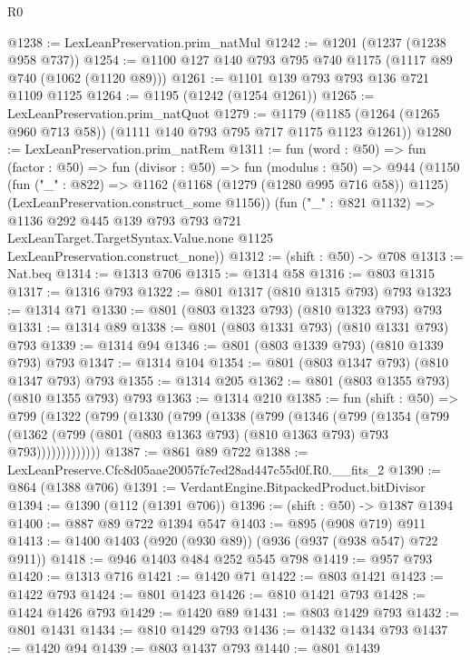 \begin{lexlean}{R0}
\begin{coremodule}
@1238 := LexLeanPreservation.prim_natMul
@1242 := @1201 (@1237 (@1238 @958 @737))
@1254 := @1100 @127 @140 @793 @795 @740 @1175 (@1117 @89 @740 (@1062 (@1120 @89)))
@1261 := @1101 @139 @793 @793 @136 @721 @1109 @1125
@1264 := @1195 (@1242 (@1254 @1261))
@1265 := LexLeanPreservation.prim_natQuot
@1279 := @1179 (@1185 (@1264 (@1265 @960 @713 @58)) (@1111 @140 @793 @795 @717 @1175 @1123 @1261))
@1280 := LexLeanPreservation.prim_natRem
@1311 := fun (word : @50) =>
  fun (factor : @50) =>
  fun (divisor : @50) =>
  fun (modulus : @50) =>
  @944
    (@1150
      (fun ("_" : @822) =>
      @1162 (@1168 (@1279 (@1280 @995 @716 @58)) @1125) (LexLeanPreservation.construct_some @1156))
      (fun ("_" : @821 @1132) =>
      @1136
        @292
        @445
        @139
        @793
        @793
        @721
        LexLeanTarget.TargetSyntax.Value.none
        @1125
        LexLeanPreservation.construct_none))
@1312 := (shift : @50) -> @708
@1313 := Nat.beq
@1314 := @1313 @706
@1315 := @1314 @58
@1316 := @803 @1315
@1317 := @1316 @793
@1322 := @801 @1317 (@810 @1315 @793) @793
@1323 := @1314 @71
@1330 := @801 (@803 @1323 @793) (@810 @1323 @793) @793
@1331 := @1314 @89
@1338 := @801 (@803 @1331 @793) (@810 @1331 @793) @793
@1339 := @1314 @94
@1346 := @801 (@803 @1339 @793) (@810 @1339 @793) @793
@1347 := @1314 @104
@1354 := @801 (@803 @1347 @793) (@810 @1347 @793) @793
@1355 := @1314 @205
@1362 := @801 (@803 @1355 @793) (@810 @1355 @793) @793
@1363 := @1314 @210
@1385 := fun (shift : @50) =>
  @799
    (@1322
      (@799
        (@1330
          (@799
            (@1338
              (@799
                (@1346
                  (@799
                    (@1354
                      (@799
                        (@1362
                          (@799 (@801 (@803 @1363 @793) (@810 @1363 @793) @793 @793)))))))))))))
@1387 := @861 @89 @722
@1388 := LexLeanPreserve.Cfc8d05aae20057fc7ed28ad447c55d0f.R0.__fits_2
@1390 := @864 (@1388 @706)
@1391 := VerdantEngine.BitpackedProduct.bitDivisor
@1394 := @1390 (@112 (@1391 @706))
@1396 := (shift : @50) -> @1387 @1394
@1400 := @887 @89 @722 @1394 @547
@1403 := @895 (@908 @719) @911
@1413 := @1400 @1403 (@920 (@930 @89)) (@936 (@937 (@938 @547) @722 @911))
@1418 := @946 @1403 @484 @252 @545 @798
@1419 := @957 @793
@1420 := @1313 @716
@1421 := @1420 @71
@1422 := @803 @1421
@1423 := @1422 @793
@1424 := @801 @1423
@1426 := @810 @1421 @793
@1428 := @1424 @1426 @793
@1429 := @1420 @89
@1431 := @803 @1429 @793
@1432 := @801 @1431
@1434 := @810 @1429 @793
@1436 := @1432 @1434 @793
@1437 := @1420 @94
@1439 := @803 @1437 @793
@1440 := @801 @1439

\end{coremodule}
\end{lexlean}
